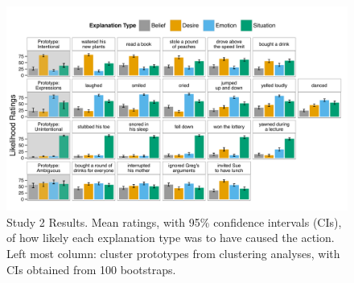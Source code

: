 \documentclass[10pt,letterpaper]{article}
\newcommand{\ndg}[1]{\textcolor{Green}{[ndg: #1]}}
\begin{document}


\begin{figure}[htb!]
\begin{center}
\includegraphics[width=1\linewidth]{images/study2Results.pdf}\end{center}
\caption{ Study 2 Results. Mean ratings, with 95\% confidence intervals (CIs), of how likely each explanation type was to have caused the action. Left most column: cluster prototypes from clustering analyses, with CIs obtained from 100 bootstraps.}
\label{Study2ResultsFig}
\end{figure}
\end{document}
